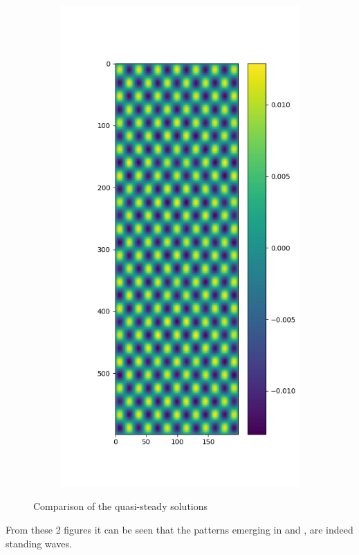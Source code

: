 \documentclass{article}
\begin{document}
\begin{figure}[H]
\begin{subfigure}{.5\textwidth}
		\includegraphics[width=.9\linewidth]{3steadyc=2.png}
	\end{subfigure}
	\caption{Comparison of the quasi-steady solutions}
\end{figure}
From these 2 figures it can be seen that the patterns emerging in  and , are indeed standing waves.
\end{document}
